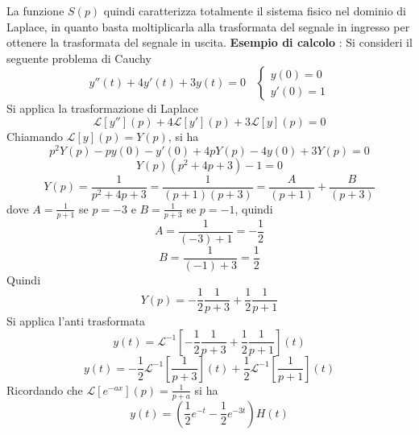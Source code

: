 \documentclass[10pt, letterpaper]{report}
\begin{document}
La funzione $S(p)$ quindi caratterizza totalmente il sistema fisico nel dominio di Laplace, in quanto basta 
moltiplicarla alla trasformata del segnale in ingresso per ottenere la trasformata del segnale in 
uscita.\acc 
\textbf{Esempio di calcolo} : Si consideri il seguente problema di Cauchy
$$ y''(t)+4y'(t)+3y(t)=0\ \ \ \ \begin{cases}
    y(0)=0\\ y'(0)=1
\end{cases}$$ 
Si applica la trasformazione di Laplace
$$\mathcal{L}[y''](p)+4\mathcal{L}[y'](p)+3\mathcal{L}[y](p)=0 $$
Chiamando $\mathcal{L}[y](p)=Y(p)$, si ha 
$$ p^2Y(p)-py(0)-y'(0)+4pY(p)-4y(0)+3Y(p)=0$$
$$ Y(p)(p^2+4p+3)-1=0$$
$$ Y(p)=\frac{1}{p^2+4p+3}=\frac{1}{(p+1)(p+3)}=\frac{A}{(p+1)}+\frac{B}{(p+3)}$$
dove $A=\frac{1}{p+1}$ se $p=-3$  e $B=\frac{1}{p+3}$ se $p=-1$, quindi 
$$ A=\frac{1}{(-3)+1}=-\frac{1}{2}$$
$$ B=\frac{1}{(-1)+3}=\frac{1}{2}$$
Quindi 
$$Y(p)=-\frac{1}{2}\frac{1}{p+3}+\frac{1}{2}\frac{1}{p+1} $$
Si applica l'anti trasformata 
$$y(t)=\mathcal{L}^{-1}[-\frac{1}{2}\frac{1}{p+3}+\frac{1}{2}\frac{1}{p+1}](t) $$
$$y(t)=-\frac{1}{2}\mathcal{L}^{-1}[\frac{1}{p+3}](t)+\frac{1}{2}\mathcal{L}^{-1}[\frac{1}{p+1}](t) $$
Ricordando che $\mathcal{L}[e^{-ax}](p)=\frac{1}{p+a}$ si ha
$$ y(t)=(\frac{1}{2}e^{-t}-\frac{1}{2}e^{-3t})H(t)$$
\begin{center}
    \begin{figure}[h!]
       \centering
   \end{figure}
   \end{center}
\end{document}
